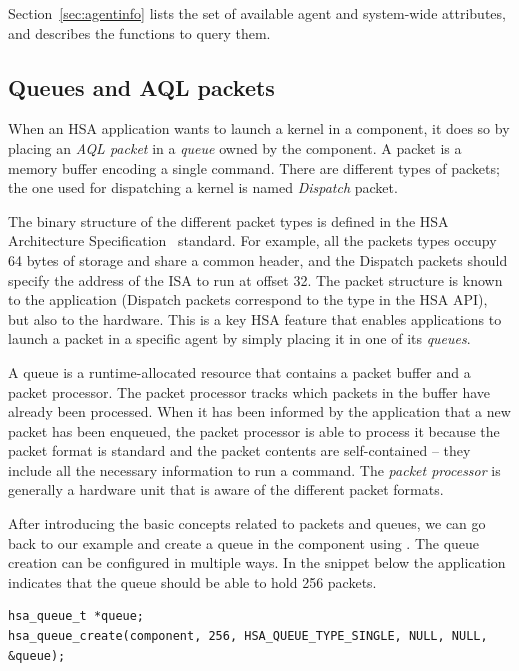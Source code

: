 \documentclass[final,oneside]{book}
\begin{document}
Section~\ref{sec:agentinfo} lists the set of available agent and
system-wide attributes, and describes the functions to query them.

\subsection{Queues and AQL packets}
When an HSA application wants to launch a kernel in a component, it does so by
placing an \textit{AQL packet} in a \textit{queue} owned by the component. A
packet is a memory buffer encoding a single command. There are different types
of packets; the one used for dispatching a kernel is named \emph{Dispatch}
packet.

The binary structure of the different packet types is defined in the HSA
Architecture Specification~\cite{sar} standard. For example, all the packets
types occupy 64 bytes of storage and share a common header, and the Dispatch
packets should specify the address of the ISA to run at offset 32. The packet
structure is known to the application (Dispatch packets correspond to the
 type in the HSA API), but also to the
hardware. This is a key HSA feature that enables applications to launch a packet
in a specific agent by simply placing it in one of its \textit{queues}.

A queue is a runtime-allocated resource that contains a packet buffer and a
packet processor. The packet processor tracks which packets in the buffer have
already been processed. When it has been informed by the application that a new packet
has been enqueued, the packet processor is able to process it because the packet
format is standard and the packet contents are self-contained -- they include
all the necessary information to run a command. The \textit{packet processor} is
generally a hardware unit that is aware of the different packet formats.

After introducing the basic concepts related to packets and queues, we can go
back to our example and create a queue in the component using
. The queue creation can be configured in multiple
ways. In the snippet below the application indicates that the queue should
be able to hold 256 packets.
\begin{lstlisting}
hsa_queue_t *queue;
hsa_queue_create(component, 256, HSA_QUEUE_TYPE_SINGLE, NULL, NULL, &queue);
\end{lstlisting}
\end{document}
